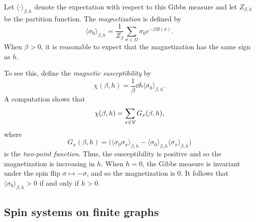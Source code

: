 Let $\langle\cdot\rangle_{\beta,h}$ denote the expectation with respect to
this Gibbs measure and let $Z_{\beta,h}$ be the partition function.
The \emph{magnetization} is defined by
\begin{equation}
\langle \sigma_0 \rangle_{\beta,h} = \frac{1}{Z_\beta} \sum_{\sigma\in\Omega} \sigma_0 e^{-\beta H(\sigma)}.
\end{equation}
When $\beta > 0$, it is reasonable to expect that the magnetization has the
same sign as $h$.

To see this, define the \emph{magnetic susceptibility} by
\begin{equation}
\chi(\beta, h)
	=
\frac{1}{\beta} \dd{}{h} \langle \sigma_0 \rangle_{\beta,h}.
\end{equation}
A computation shows that
\begin{equation}
\chi(\beta, h) = \sum_{x\in\mathcal{V}} G_x(\beta, h),
\end{equation}
where
\begin{equation}
G_x(\beta, h)
	=
\Big(
	\langle \sigma_0 \sigma_x \rangle_{\beta,h}
		-
	\langle \sigma_0 \rangle_{\beta,h} \langle \sigma_x \rangle_{\beta,h}
\Big)
\end{equation}
is the \emph{two-point function}.
Thus, the susceptibility is positive and so the magnetization is increasing
in $h$. When $h = 0$, the Gibbs measure is invariant under the spin flip
$\sigma \mapsto -\sigma$, and so the magnetization is $0$. It follows that
$\langle \sigma_0 \rangle_{\beta,h} > 0$ if and only if $h > 0$.


\subsection{Spin systems on finite graphs}

